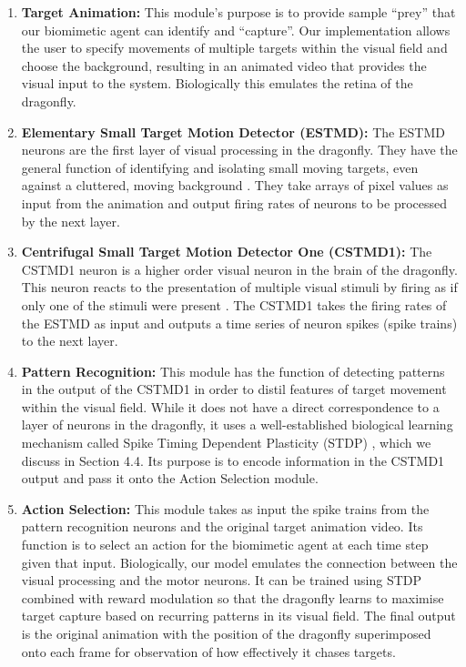 \documentclass[a4paper,11pt]{article}
\begin{document}
\begin{enumerate}
\item \textbf{Target Animation:} This module's purpose is to provide sample ``prey'' that our biomimetic agent can identify and ``capture''. Our implementation allows the user to specify movements of multiple targets within the visual field and choose the background, resulting in an animated video that provides the visual input to the system. Biologically this emulates the retina of the dragonfly.

\item \textbf{Elementary Small Target Motion Detector (ESTMD):} The ESTMD neurons are the first layer of visual processing in the dragonfly. They have the general function of identifying and isolating small moving targets, even against a cluttered, moving background \cite{Wiederman2008}. They take arrays of pixel values as input from the animation and output firing rates of neurons to be processed by the next layer.

\item \textbf{Centrifugal Small Target Motion Detector One (CSTMD1):} The CSTMD1 neuron is a higher order visual neuron in the brain of the dragonfly. This neuron reacts to the presentation of multiple visual stimuli by firing as if only one of the stimuli were present \cite{w13}. The CSTMD1 takes the firing rates of the ESTMD as input and outputs a time series of neuron spikes (spike trains) to the next layer.

\item \textbf{Pattern Recognition:} This module has the function of detecting patterns in the output of the CSTMD1 in order to distil features of target movement within the visual field. While it does not have a direct correspondence to a layer of neurons in the dragonfly, it uses a well-established biological learning mechanism called Spike Timing Dependent Plasticity (STDP) \cite{stdp1}, which we discuss in Section 4.4. Its purpose is to encode information in the CSTMD1 output and pass it onto the Action Selection module.

\item \textbf{Action Selection:} This module takes as input the spike trains from the pattern recognition neurons and the original target animation video. Its function is to select an action for the biomimetic agent at each time step given that input. Biologically, our model emulates the connection between the visual processing and the motor neurons. It can be trained using STDP combined with reward modulation so that the dragonfly learns to maximise target capture based on recurring patterns in its visual field. The final output is the original animation with the position of the dragonfly superimposed onto each frame for observation of how effectively it chases targets.
\end{enumerate}
\end{document}
